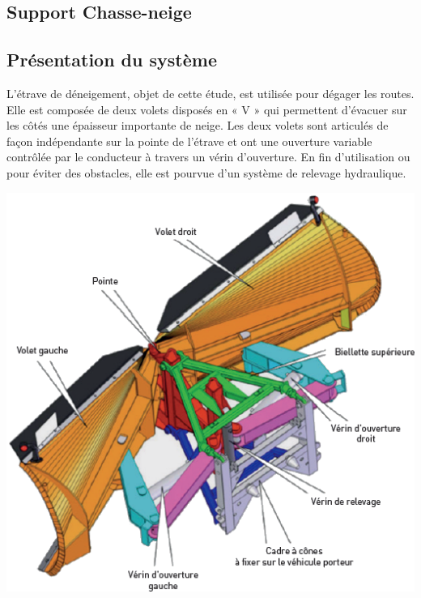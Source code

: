 \documentclass[10pt,fleqn]{article} %
\begin{document}
\def\pathfig{images}

\vspace{4.5cm}
\pagestyle{fancy}
\thispagestyle{plain}

\def\columnseprulecolor{\color{ocre}}
\setlength{\columnseprule}{0.4pt} 

\def\pathfig{images}

\ifprof
\else
\begin{multicols}{2}
\fi


\section{Support Chasse-neige}
\subsection*{Présentation du système}
L’étrave de déneigement, objet de cette étude, est utilisée pour dégager les routes. Elle est composée de deux volets disposés en « V » qui permettent d’évacuer sur les côtés une épaisseur importante de neige. Les deux volets sont articulés de façon indépendante sur la
pointe de l’étrave et ont une ouverture variable contrôlée par le conducteur à travers
un vérin d’ouverture. En fin d’utilisation ou pour éviter des obstacles, elle est pourvue d’un système de relevage hydraulique.
\begin{center}
\includegraphics[width=\linewidth]{images/fig_01}
\end{center}


\end{multicols}
\end{document}
